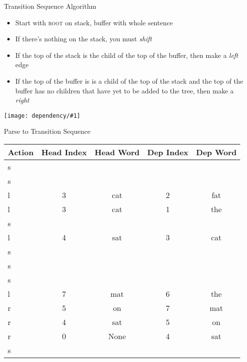 \documentclass[compress]{beamer}
\newcommand{\gfx}[2]{
\begin{center}
	\texttt{[image: dependency/\#1]}
\end{center}
}
\begin{document}
\begin{frame}{Transition Sequence Algorithm}

  \begin{itemize}
    \item Start with \textsc{root} on stack, buffer with whole sentence
    \item If there's nothing on the stack, you must \emph{shift}
    \item If the top of the stack is the child of the top of the
      buffer, then make a \emph{left} edge
    \item If the top of the buffer is is a child of the top of the
      stack and the top of the buffer has no children that have yet to
      be added to the tree, then make a \emph{right}
  \end{itemize}

\gfx{the_fat_cat_sat_on_the_mat}{.8}

\end{frame}

\begin{frame}{Parse to Transition Sequence}

\begin{tabular}{lcccc}
Action & Head Index & Head Word & Dep Index & Dep Word \\
\hline
s &  &  &  &  \\ \pause
s &  &  &  &  \\\pause
l & 3 & cat & 2 & fat \\\pause
l & 3 & cat & 1 & the \\\pause
s &  &  &  &  \\\pause
l & 4 & sat & 3 & cat \\\pause
s &  &  &  &  \\\pause
s &  &  &  &  \\\pause
s &  &  &  &  \\\pause
l & 7 & mat & 6 & the \\\pause
r & 5 & on & 7 & mat \\\pause
r & 4 & sat & 5 & on \\\pause
r & 0 & None & 4 & sat \\\pause
s &  &  &  &  \\
\end{tabular}
\end{frame}
\end{document}

